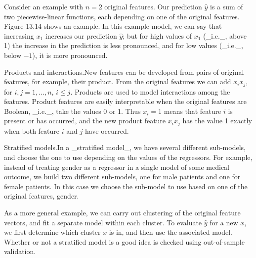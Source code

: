 Consider an example with \(n=2\) original features. Our prediction \(\hat{y}\) is a sum of two piecewise-linear functions, each depending on one of the original features. Figure 13.14 shows an example. In this example model, we can say that increasing \(x_{1}\) increases our prediction \(\hat{y}\); but for high values of \(x_{1}\) (_i.e._, above 1) the increase in the prediction is less pronounced, and for low values (_i.e._, below \(-1\)), it is more pronounced.

Products and interactions.New features can be developed from pairs of original features, for example, their product. From the original features we can add \(x_{i}x_{j}\), for \(i,j=1,\ldots,n\), \(i\leq j\). Products are used to model interactions among the features. Product features are easily interpretable when the original features are Boolean, _i.e._, take the values 0 or 1. Thus \(x_{i}=1\) means that feature \(i\) is present or has occurred, and the new product feature \(x_{i}x_{j}\) has the value 1 exactly when both feature \(i\) and \(j\) have occurred.

Stratified models.In a _stratified model_, we have several different sub-models, and choose the one to use depending on the values of the regressors. For example, instead of treating gender as a regressor in a single model of some medical outcome, we build two different sub-models, one for male patients and one for female patients. In this case we choose the sub-model to use based on one of the original features, gender.

As a more general example, we can carry out clustering of the original feature vectors, and fit a separate model within each cluster. To evaluate \(\hat{y}\) for a new \(x\), we first determine which cluster \(x\) is in, and then use the associated model. Whether or not a stratified model is a good idea is checked using out-of-sample validation.

 